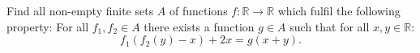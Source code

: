 Find all non-empty finite sets $A$ of functions $f\colon\mathbb{R} \to \mathbb{R}$ which fulfil the following property:
For all $f_1, f_2 \in A$ there exists a function $g \in A$ such that for all $x,y \in \mathbb{R}$:
$$f_1(f_2(y)-x) + 2x = g(x+y).$$
